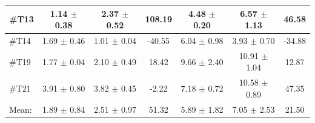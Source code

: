 \begin{longtable} {l|c|c|c|c|c|c}
\#T13 & 1.14 $\pm$ 0.38 & 2.37 $\pm$ 0.52 & 108.19 & 4.48 $\pm$ 0.20 & 6.57 $\pm$ 1.13 & 46.58\\ \hline
\#T14 & 1.69 $\pm$ 0.46 & 1.01 $\pm$ 0.04 & -40.55 & 6.04 $\pm$ 0.98 & 3.93 $\pm$ 0.70 & -34.88 \\ \hline
\#T19 & 1.77 $\pm$ 0.04 & 2.10 $\pm$ 0.49 & 18.42 & 9.66 $\pm$ 2.40 & 10.91  $\pm$ 1.04 & 12.87 \\ \hline
\#T21 & 3.91 $\pm$ 0.80 & 3.82 $\pm$ 0.45 & -2.22 &7.18 $\pm$ 0.72 & 10.58 $\pm$ 0.89 & 47.35 \\ \hline
Mean:  & 1.89 $\pm$ 0.84 & 2.51 $\pm$ 0.97 & 51.32 & 5.89 $\pm$ 1.82 & 7.05 $\pm$ 2.53 & 21.50 \\ \hline 
\end{longtable}


